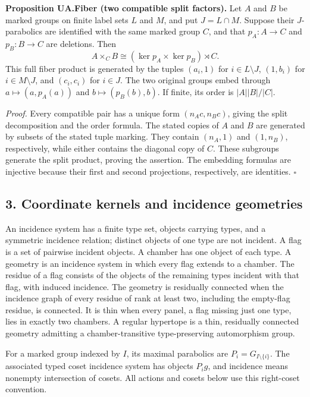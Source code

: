 \documentclass[
  11pt,
  a4paper,
]{article}
\begin{document}
\textbf{Proposition UA.Fiber (two compatible split factors).} Let \(A\)
and \(B\) be marked groups on finite label sets \(L\) and \(M\), and put
\(J=L\cap M\). Suppose their \(J\)-parabolics are identified with the
same marked group \(C\), and that \(p_A:A\to C\) and \(p_B:B\to C\) are
deletions. Then \[
A\times_C B\cong(\ker p_A\times\ker p_B)\rtimes C.
\tag{F1}
\] This full fiber product is generated by the tuples \((a_i,1)\) for
\(i\in L\setminus J\), \((1,b_i)\) for \(i\in M\setminus J\), and
\((c_i,c_i)\) for \(i\in J\). The two original groups embed through
\(a\mapsto(a,p_A(a))\) and \(b\mapsto(p_B(b),b)\). If finite, its order
is \(|A||B|/|C|\).

\emph{Proof.} Every compatible pair has a unique form \((n_Ac,n_Bc)\),
giving the split decomposition and the order formula. The stated copies
of \(A\) and \(B\) are generated by subsets of the stated tuple marking.
They contain \((n_A,1)\) and \((1,n_B)\), respectively, while either
contains the diagonal copy of \(C\). These subgroups generate the split
product, proving the assertion. The embedding formulas are injective
because their first and second projections, respectively, are
identities. \(\square\)

\subsection{3. Coordinate kernels and incidence
geometries}\label{coordinate-kernels-and-incidence-geometries}

An incidence system has a finite type set, objects carrying types, and a
symmetric incidence relation; distinct objects of one type are not
incident. A flag is a set of pairwise incident objects. A chamber has
one object of each type. A geometry is an incidence system in which
every flag extends to a chamber. The residue of a flag consists of the
objects of the remaining types incident with that flag, with induced
incidence. The geometry is residually connected when the incidence graph
of every residue of rank at least two, including the empty-flag residue,
is connected. It is thin when every panel, a flag missing just one type,
lies in exactly two chambers. A regular hypertope is a thin, residually
connected geometry admitting a chamber-transitive type-preserving
automorphism group.

For a marked group indexed by \(I\), its maximal parabolics are
\(P_i=G_{I\setminus\{i\}}\). The associated typed coset incidence system
has objects \(P_i g\), and incidence means nonempty intersection of
cosets. All actions and cosets below use this right-coset convention.
\end{document}

